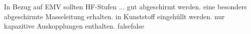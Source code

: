     {In Bezug auf EMV sollten HF-Stufen ...}
    {gut abgeschirmt werden.}
    {eine besonders abgeschirmte Masseleitung erhalten.}
    {in Kunststoff eingehüllt werden.}
    {nur kapazitive Auskopplungen enthalten.}
    {false}{false}